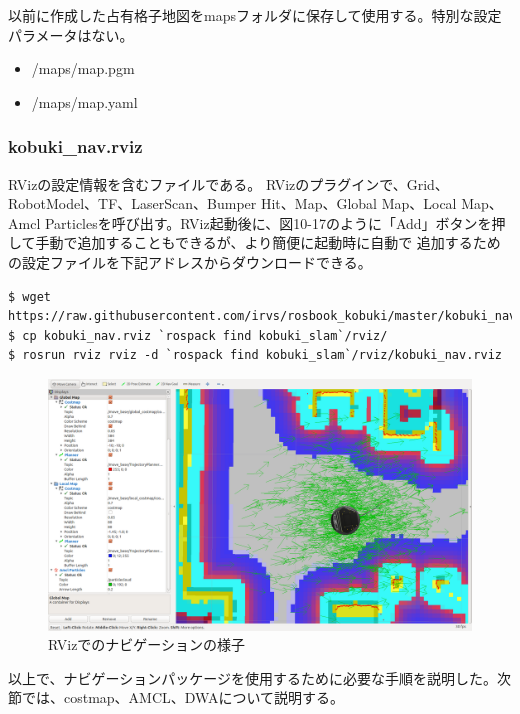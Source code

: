 以前に作成した占有格子地図をmapsフォルダに保存して使用する。特別な設定パラメータはない。

\begin{itemize}
\item /maps/map.pgm
\item /maps/map.yaml
\end{itemize}

\subsubsection{kobuki\_nav.rviz}

RVizの設定情報を含むファイルである。 RVizのプラグインで、Grid、RobotModel、TF、LaserScan、Bumper Hit、Map、Global Map、Local Map、Amcl Particlesを呼び出す。RViz起動後に、図10-17のように「Add」ボタンを押して手動で追加することもできるが、より簡便に起動時に自動で  追加するための設定ファイルを下記アドレスからダウンロードできる。

\begin{lstlisting}[language=ROS]
$ wget https://raw.githubusercontent.com/irvs/rosbook_kobuki/master/kobuki_navigation/rviz/kobuki_nav.rviz
$ cp kobuki_nav.rviz `rospack find kobuki_slam`/rviz/
$ rosrun rviz rviz -d `rospack find kobuki_slam`/rviz/kobuki_nav.rviz
\end{lstlisting}

\begin{figure}[htp]
  \centering
  \includegraphics[width=\columnwidth]{pictures/chapter10/pic_10_17.png}
  \caption{RVizでのナビゲーションの様子}
\end{figure}

以上で、ナビゲーションパッケージを使用するために必要な手順を説明した。次節では、costmap、AMCL、DWAについて説明する。

